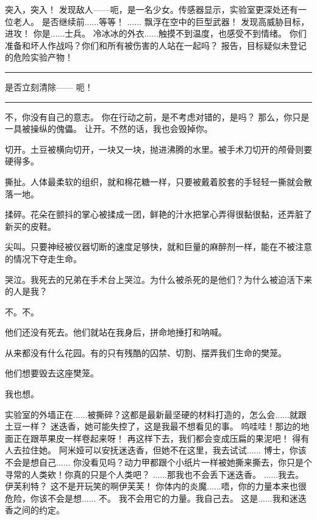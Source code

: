 \documentclass[openany]{book}
\begin{document}
\begin{dialogue}
     突入，突入！
     发现敌人——呃，是一名少女。传感器显示，实验室更深处还有一位老人。
     是否继续前......等等！
     ......
     飘浮在空中的巨型武器！
     发现高威胁目标，进攻！
     你是......士兵。
     冷冰冰的外衣......触摸不到温度，也感受不到情绪。
     你们准备和坏人作战吗？你们和所有被伤害的人站在一起吗？
     报告，目标疑似未登记的危险实验产物！
    \par\noindent\rule{\textwidth}{0.4pt}
     是否立刻清除——
     呃！
    \par\noindent\rule{\textwidth}{0.4pt}
     不，你没有自己的意志。
     你在行动之前，是不考虑对错的，是吗？
     那么，你只是一具被操纵的傀儡。
     让开。不然的话，我也会毁掉你。
\end{dialogue}\par

切开。土豆被横向切开，一块又一块，抛进沸腾的水里。被手术刀切开的颅骨则要硬得多。\par
撕扯。人体最柔软的组织，就和棉花糖一样，只要被戴着胶套的手轻轻一撕就会散落一地。\par
揉碎。花朵在颤抖的掌心被揉成一团，鲜艳的汁水把掌心弄得很黏很黏，还弄脏了新买的皮鞋。\par
尖叫。只要神经被仪器切断的速度足够快，就和巨量的麻醉剂一样，能在不被注意的情况下夺走生命。\par
哭泣。我死去的兄弟在手术台上哭泣。为什么被杀死的是他们？为什么被迫活下来的人是我？\par
不。不。\par
他们还没有死去。他们就站在我身后，拼命地捶打和呐喊。\par
从来都没有什么花园。有的只有残酷的囚禁、切割、摆弄我们生命的樊笼。\par
他们想要毁去这座樊笼。\par
我也想。

\begin{dialogue}
     实验室的外墙正在......被撕碎？这都是最新最坚硬的材料打造的，怎么会......就跟土豆一样？
     迷迭香，她可能失控了，这是我最不想看见的事。
     呜哇哇！那边的地面正在跟苹果皮一样卷起来呀！
     再这样下去，我们都会变成压扁的果泥吧！
     得有人去拉住她。
     阿米娅可以安抚迷迭香，但她不在这里，我去试试......
     博士，你该不会是想自己......
     你没看见吗？动力甲都跟个小纸片一样被她撕来撕去，你只是个寻常的人类欸！你真的只是个人类吧？
     ......那我也不会丢下迷迭香。
     ......我去。
     伊芙利特？
     这不是开玩笑的啊伊芙芙！
     你体内的炎魔......唔，你的力量本来也很危险，你该不会是想......
     不。
     我不会用它的力量。我自己去。
     这是......我和迷迭香之间的约定。
\end{dialogue}
\end{document}

